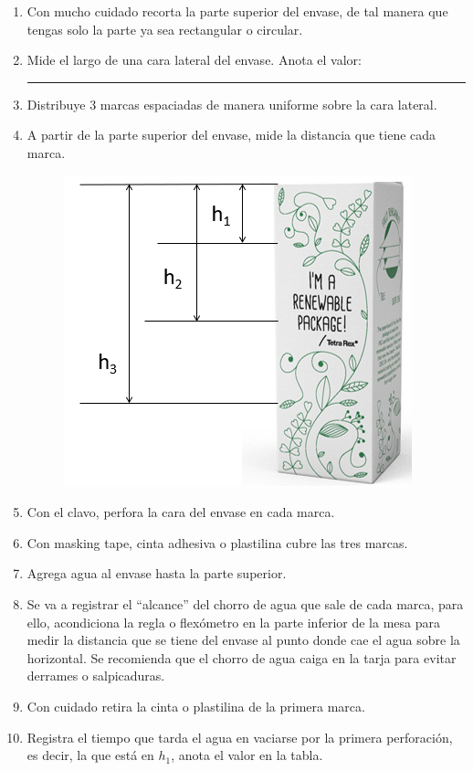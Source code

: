 \documentclass[14pt]{extarticle}
\begin{document}
\begin{enumerate}
\item Con mucho cuidado recorta la parte superior del envase, de tal manera que tengas solo la parte ya sea rectangular o circular.
\item Mide el largo de una cara lateral del envase. Anota el valor: \rule{2cm}{0.1mm}
\item Distribuye 3 marcas espaciadas de manera uniforme sobre la cara lateral.
\item A partir de la parte superior del envase, mide la distancia que tiene cada marca.
\begin{figure}[H]
    \centering
    \includegraphics[scale=1]{Imagenes/Practica_04_Tetrapack_01.png}
\end{figure}
\item Con el clavo, perfora la cara del envase en cada marca.
\item Con masking tape, cinta adhesiva o plastilina cubre las tres marcas.
\item Agrega agua al envase hasta la parte superior.
\item Se va a registrar el \enquote{alcance} del chorro de agua que sale de cada marca, para ello, acondiciona la regla o flexómetro en la parte inferior de la mesa para medir la distancia que se tiene del envase al punto donde cae el agua sobre la horizontal. Se recomienda que el chorro de agua caiga en la tarja para evitar derrames o salpicaduras.
\item Con cuidado retira la cinta o plastilina de la primera marca.
\item Registra el tiempo que tarda el agua en vaciarse por la primera perforación, es decir, la que está en $h_{1}$, anota el valor en la tabla.

\end{enumerate}
\end{document}
